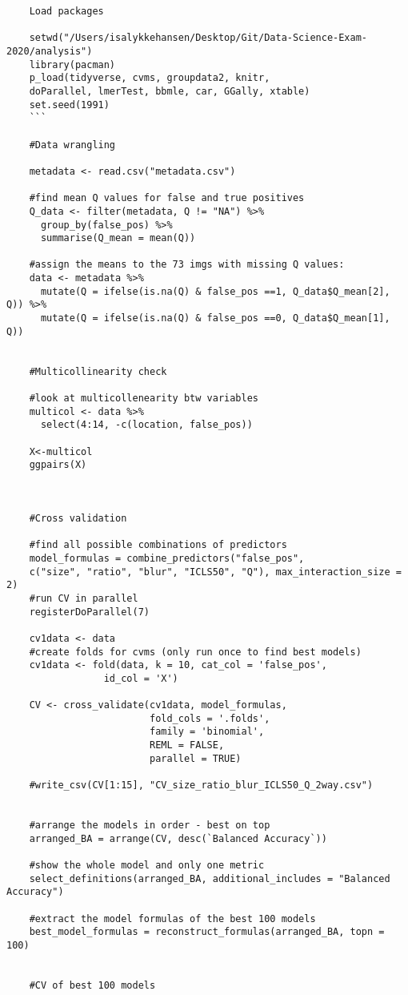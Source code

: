 \documentclass[12pt]{article}
\begin{document}
\begin{verbatim}
	Load packages

	setwd("/Users/isalykkehansen/Desktop/Git/Data-Science-Exam-2020/analysis")
	library(pacman)
	p_load(tidyverse, cvms, groupdata2, knitr, 
	doParallel, lmerTest, bbmle, car, GGally, xtable)
	set.seed(1991)
	```
	
	#Data wrangling

	metadata <- read.csv("metadata.csv") 
	
	#find mean Q values for false and true positives
	Q_data <- filter(metadata, Q != "NA") %>% 
	  group_by(false_pos) %>% 
	  summarise(Q_mean = mean(Q))
	
	#assign the means to the 73 imgs with missing Q values:
	data <- metadata %>%
	  mutate(Q = ifelse(is.na(Q) & false_pos ==1, Q_data$Q_mean[2], Q)) %>% 
	  mutate(Q = ifelse(is.na(Q) & false_pos ==0, Q_data$Q_mean[1], Q)) 

	
	#Multicollinearity check

	#look at multicollenearity btw variables
	multicol <- data %>% 
	  select(4:14, -c(location, false_pos))
	
	X<-multicol
	ggpairs(X)


	
	#Cross validation 

	#find all possible combinations of predictors
	model_formulas = combine_predictors("false_pos", 
	c("size", "ratio", "blur", "ICLS50", "Q"), max_interaction_size = 2)
	#run CV in parallel
	registerDoParallel(7)
	
	cv1data <- data
	#create folds for cvms (only run once to find best models)
	cv1data <- fold(data, k = 10, cat_col = 'false_pos', 
				 id_col = 'X')
	
	CV <- cross_validate(cv1data, model_formulas,
						 fold_cols = '.folds',
						 family = 'binomial',
						 REML = FALSE,
						 parallel = TRUE)
	
	#write_csv(CV[1:15], "CV_size_ratio_blur_ICLS50_Q_2way.csv")
	
	
	#arrange the models in order - best on top
	arranged_BA = arrange(CV, desc(`Balanced Accuracy`))
	
	#show the whole model and only one metric
	select_definitions(arranged_BA, additional_includes = "Balanced Accuracy")
	
	#extract the model formulas of the best 100 models
	best_model_formulas = reconstruct_formulas(arranged_BA, topn = 100)

	
	#CV of best 100 models


\end{verbatim}
\end{document}
